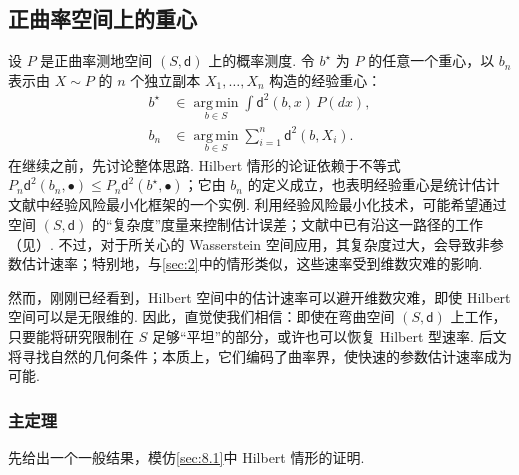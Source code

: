 \subsection{正曲率空间上的重心}\label{sec:8.2}
设 $P$ 是正曲率测地空间 $(S,\mathsf d)$ 上的概率测度. 令 $b^\star$ 为 $P$ 的任意一个重心，以 $b_n$ 表示由 $X\sim P$ 的 $n$ 个独立副本 $X_1,\ldots,X_n$ 构造的经验重心：
$$\begin{aligned}
b^\star&\in\operatorname*{arg\,min}_{b\in S}\int\mathsf d^2(b,x)\,P(dx),\\
b_n&\in\operatorname*{arg\,min}_{b\in S}\sum_{i=1}^n\mathsf d^2(b,X_i).
\end{aligned}$$
在继续之前，先讨论整体思路. Hilbert 情形的论证依赖于不等式 $P_n\mathsf d^2(b_n,\bullet)\le P_n\mathsf d^2(b^\star,\bullet)$；它由 $b_n$ 的定义成立，也表明经验重心是统计估计文献中经验风险最小化框架的一个实例. 利用经验风险最小化技术，可能希望通过空间 $(S,\mathsf d)$ 的“复杂度”度量来控制估计误差；文献中已有沿这一路径的工作（见\cite{ref4}）. 不过，对于所关心的 Wasserstein 空间应用，其复杂度过大，会导致非参数估计速率；特别地，与\autoref{sec:2}中的情形类似，这些速率受到维数灾难的影响.

然而，刚刚已经看到，Hilbert 空间中的估计速率可以避开维数灾难，即使 Hilbert 空间可以是无限维的. 因此，直觉使我们相信：即使在弯曲空间 $(S,\mathsf d)$ 上工作，只要能将研究限制在 $S$ 足够“平坦”的部分，或许也可以恢复 Hilbert 型速率. 后文将寻找自然的几何条件；本质上，它们编码了曲率界，使快速的参数估计速率成为可能.

\subsubsection{主定理}\label{sec:8.2.1}
先给出一个一般结果，模仿\autoref{sec:8.1}中 Hilbert 情形的证明.

